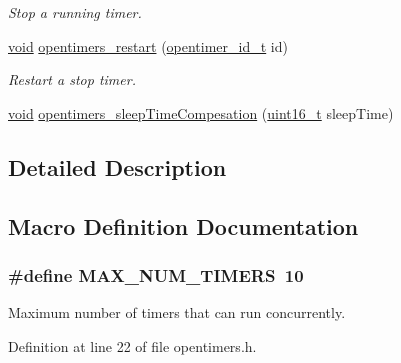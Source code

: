 \begin{DoxyCompactItemize}
\begin{DoxyCompactList}\small\item\em Stop a running timer. \end{DoxyCompactList}\item 
\hyperlink{usb__devapi_8h_afabf60e7f57651d6d595a02c75f07cd0}{void} \hyperlink{group___open_timers_gadd9e89367c4769f448443ad4910c7396}{opentimers\+\_\+restart} (\hyperlink{group___open_timers_gae5ca9e65d270cdfa4bc74008d96d69ab}{opentimer\+\_\+id\+\_\+t} id)
\begin{DoxyCompactList}\small\item\em Restart a stop timer. \end{DoxyCompactList}\item 
\hyperlink{usb__devapi_8h_afabf60e7f57651d6d595a02c75f07cd0}{void} \hyperlink{group___open_timers_ga311e64b9f72f4cf7fc73109784a56e3a}{opentimers\+\_\+sleep\+Time\+Compesation} (\hyperlink{_p_e___types_8h_a1f1825b69244eb3ad2c7165ddc99c956}{uint16\+\_\+t} sleep\+Time)
\end{DoxyCompactItemize}


\subsection{Detailed Description}


\subsection{Macro Definition Documentation}
\subsubsection[{\texorpdfstring{M\+A\+X\+\_\+\+N\+U\+M\+\_\+\+T\+I\+M\+E\+RS}{MAX_NUM_TIMERS}}]{\setlength{\rightskip}{0pt plus 5cm}\#define M\+A\+X\+\_\+\+N\+U\+M\+\_\+\+T\+I\+M\+E\+RS~10}\hypertarget{group___open_timers_gaacf8ae36c6e504e7361613a7d9a85d69}{}\label{group___open_timers_gaacf8ae36c6e504e7361613a7d9a85d69}


Maximum number of timers that can run concurrently. 



Definition at line 22 of file opentimers.\+h.

